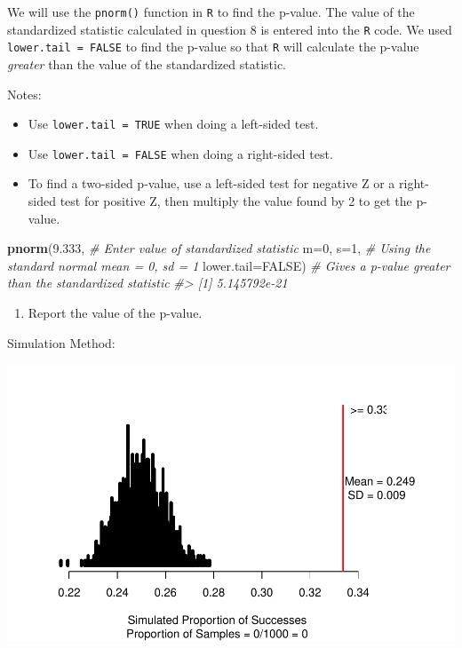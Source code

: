 \documentclass[
]{report}
\newenvironment{Shaded}{\begin{snugshade}}{\end{snugshade}}
\newcommand{\AttributeTok}[1]{\textcolor[rgb]{0.13,0.29,0.53}{#1}}
\newcommand{\CommentTok}[1]{\textcolor[rgb]{0.56,0.35,0.01}{\textit{#1}}}
\newcommand{\ConstantTok}[1]{\textcolor[rgb]{0.56,0.35,0.01}{#1}}
\newcommand{\DecValTok}[1]{\textcolor[rgb]{0.00,0.00,0.81}{#1}}
\newcommand{\FloatTok}[1]{\textcolor[rgb]{0.00,0.00,0.81}{#1}}
\newcommand{\FunctionTok}[1]{\textcolor[rgb]{0.13,0.29,0.53}{\textbf{#1}}}
\newcommand{\NormalTok}[1]{#1}
\providecommand{\tightlist}{%
  \setlength{\itemsep}{0pt}\setlength{\parskip}{0pt}}
\begin{document}
\vspace{1in}

We will use the \texttt{pnorm()} function in \texttt{R} to find the p-value. The value of the standardized statistic calculated in question 8 is entered into the \texttt{R} code. We used \texttt{lower.tail\ =\ FALSE} to find the p-value so that \texttt{R} will calculate the p-value \emph{greater} than the value of the standardized statistic.

Notes:

\begin{itemize}
\tightlist
\item
  Use \texttt{lower.tail\ =\ TRUE} when doing a left-sided test.
\item
  Use \texttt{lower.tail\ =\ FALSE} when doing a right-sided test.
\item
  To find a two-sided p-value, use a left-sided test for negative Z or a right-sided test for positive Z, then multiply the value found by 2 to get the p-value.
\end{itemize}

\begin{Shaded}
\begin{Highlighting}[]
\FunctionTok{pnorm}\NormalTok{(}\FloatTok{9.333}\NormalTok{, }\CommentTok{\# Enter value of standardized statistic}
      \AttributeTok{m=}\DecValTok{0}\NormalTok{, }\AttributeTok{s=}\DecValTok{1}\NormalTok{, }\CommentTok{\# Using the standard normal mean = 0, sd = 1}
      \AttributeTok{lower.tail=}\ConstantTok{FALSE}\NormalTok{) }\CommentTok{\# Gives a p{-}value greater than the standardized statistic}
\CommentTok{\#\textgreater{} [1] 5.145792e{-}21}
\end{Highlighting}
\end{Shaded}

\begin{enumerate}
\def\labelenumi{\arabic{enumi}.}
\setcounter{enumi}{8}
\tightlist
\item
  Report the value of the p-value.
\end{enumerate}

\vspace{0.1in}

Simulation Method:

\begin{center}\includegraphics[width=0.85\linewidth]{05-UR-module4_review_files/figure-latex/unnamed-chunk-2-1} \end{center}
\end{document}
